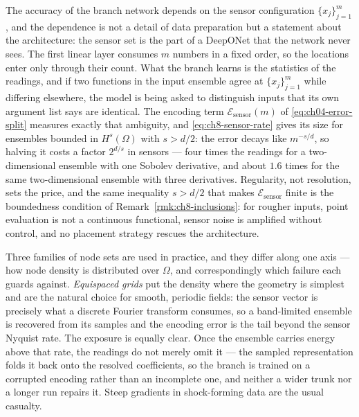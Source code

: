 The accuracy of the branch network depends on the sensor configuration
$\{x_j\}_{j=1}^{m}$, and the dependence is not a detail of data preparation but a statement
about the architecture: the sensor set is the part of a DeepONet that the network never sees.
The first linear layer consumes $m$ numbers in a fixed order, so the locations enter only
through their count. What the branch learns is the statistics of the readings, and if two
functions in the input ensemble agree at $\{x_j\}_{j=1}^{m}$ while differing elsewhere, the
model is being asked to distinguish inputs that its own argument list says are identical. The
encoding term $\mathcal{E}_{\text{sensor}}(m)$ of \eqref{eq:ch04-error-split} measures exactly
that ambiguity, and \eqref{eq:ch8-sensor-rate} gives its size for ensembles bounded in
$H^{s}(\Omega)$ with $s > d/2$: the error decays like $m^{-s/d}$, so halving it costs a
factor $2^{d/s}$ in sensors --- four times the readings for a two-dimensional ensemble with one
Sobolev derivative, and about $1.6$ times for the same two-dimensional ensemble with three
derivatives.
Regularity, not resolution, sets the price, and the same inequality $s > d/2$ that makes
$\mathcal{E}_{\text{sensor}}$ finite is the boundedness condition of
Remark~\ref{rmk:ch8-inclusions}: for rougher inputs, point evaluation is not a continuous
functional, sensor noise is amplified without control, and no placement strategy rescues the
architecture.

Three families of node sets are used in practice, and they differ along one axis --- how node
density is distributed over $\Omega$, and correspondingly which failure each guards
against.
\emph{Equispaced grids} put the density where the geometry is simplest and are the natural
choice for smooth, periodic fields: the sensor vector is precisely what a discrete Fourier
transform consumes, so a band-limited ensemble is recovered from its samples and the encoding
error is the tail beyond the sensor Nyquist rate. The
exposure is equally clear. Once the ensemble carries energy above that rate, the readings do
not merely omit it --- the sampled representation folds it back onto the resolved coefficients,
so the branch is trained on a corrupted encoding rather than an incomplete one, and neither a
wider trunk nor a longer run repairs it. Steep gradients in
shock-forming data are the usual casualty.

